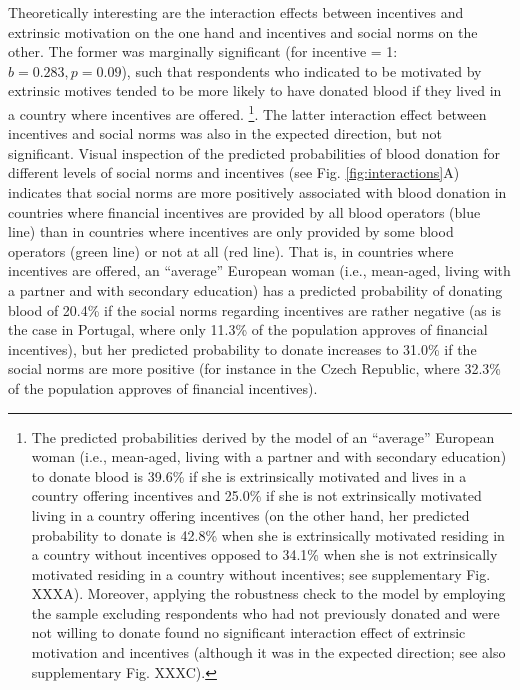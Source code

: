 \documentclass[AER]{AEA}
\begin{document}
Theoretically interesting are the interaction effects between incentives and extrinsic motivation on the one hand and incentives and social norms on the other. The former was marginally significant (for incentive = 1: $b = 0.283, p = 0.09$), such that respondents who indicated to be motivated by extrinsic motives tended to be more likely to have donated blood if they lived in a country where incentives are offered. \footnote{The predicted probabilities derived by the model of an “average” European woman (i.e., mean-aged, living with a partner and with secondary education) to donate blood is 39.6\% if she is extrinsically motivated and lives in a country offering incentives and 25.0\% if she is not extrinsically motivated living in a country offering incentives (on the other hand, her predicted probability to donate is 42.8\% when she is extrinsically motivated residing in a country without incentives opposed to 34.1\% when she is not extrinsically motivated residing in a country without incentives; see supplementary Fig. XXXA). Moreover, applying the robustness check to the model by employing the sample excluding respondents who had not previously donated and were not willing to donate found no significant interaction effect of extrinsic motivation and incentives (although it was in the expected direction; see also supplementary Fig. XXXC).}. The latter interaction effect between incentives and social norms was also in the expected direction, but not significant. Visual inspection of the predicted probabilities of blood donation for different levels of social norms and incentives (see Fig. \ref{fig:interactions}A) indicates that social norms are more positively associated with blood donation in countries where financial incentives are provided by all blood operators (blue line) than in countries where incentives are only provided by some blood operators (green line) or not at all (red line). That is, in countries where incentives are offered, an “average” European woman (i.e., mean-aged, living with a partner and with secondary education) has a predicted probability of donating blood of 20.4\% if the social norms regarding incentives are rather negative (as is the case in Portugal, where only 11.3\% of the population approves of financial incentives), but her predicted probability to donate increases to 31.0\% if the social norms are more positive (for instance in the Czech Republic, where 32.3\% of the population approves of financial incentives).
\end{document}
